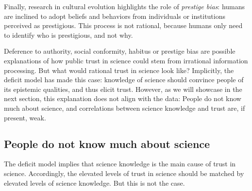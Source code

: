 \documentclass[
  jou,
  floatsintext,
  longtable,
  nolmodern,
  notxfonts,
  notimes,
  colorlinks=true,linkcolor=blue,citecolor=blue,urlcolor=blue]{apa7}
\begin{document}
Finally, research in cultural evolution highlights the role of
\emph{prestige bias}: humans are inclined to adopt beliefs and behaviors
from individuals or institutions perceived as prestigious. This process
is not rational, because humans only need to identify who is
prestigious, and not why.

Deference to authority, social conformity, habitus or prestige bias are
possible explanations of how public trust in science could stem from
irrational information processing. But what would rational trust in
science look like? Implicitly, the deficit model has made this case:
knowledge of science should convince people of its epistemic qualities,
and thus elicit trust. However, as we will showcase in the next section,
this explanation does not align with the data: People do not know much
about science, and correlations between science knowledge and trust are,
if present, weak.

\subsection{People do not know much about
science}\label{people-do-not-know-much-about-science}

The deficit model implies that science knowledge is the main cause of
trust in science. Accordingly, the elevated levels of trust in science
should be matched by elevated levels of science knowledge. But this is
not the case.
\end{document}
